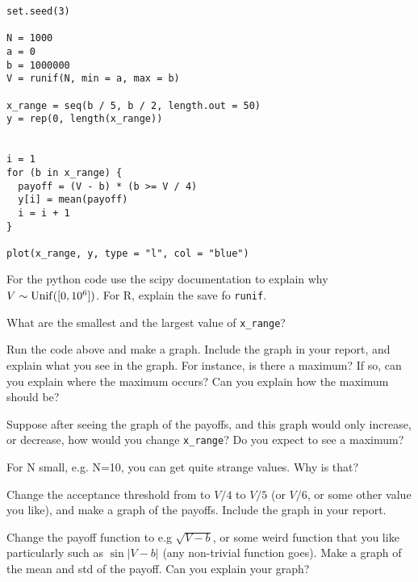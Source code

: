 \begin{verbatim}
set.seed(3)

N = 1000
a = 0
b = 1000000
V = runif(N, min = a, max = b)

x_range = seq(b / 5, b / 2, length.out = 50)
y = rep(0, length(x_range))


i = 1
for (b in x_range) {
  payoff = (V - b) * (b >= V / 4)
  y[i] = mean(payoff)
  i = i + 1
}

plot(x_range, y, type = "l", col = "blue")
\end{verbatim}


\begin{exercise}
For the python code use the scipy documentation to explain why $V\sim\mathrm{Unif}([0,10^{6}])$. For R, explain the save fo \texttt{runif}.
\end{exercise}



\begin{exercise}
What are the smallest and the largest value of \verb|x_range|?
\end{exercise}

\begin{exercise}
Run the code above and make a graph. Include the graph in your report, and explain what you see in the graph. For instance, is there a maximum? If so, can you explain where the maximum occurs? Can you explain how the maximum should be?
\end{exercise}


\begin{exercise}
Suppose after seeing the graph of the payoffs, and this graph would only increase, or decrease, how would you change \verb|x_range|? Do you expect to see a maximum?
\end{exercise}




\begin{exercise}
For N small, e.g. N=10, you can get quite strange values. Why is that?
\end{exercise}


\begin{exercise}
Change the acceptance threshold from to $V/4$ to $V/5$ (or $V/6$, or some other value you like), and make a graph of the payoffs.
Include the graph in your report.
\end{exercise}

\begin{exercise}
Change the payoff function to e.g $\sqrt{V-b}$, or some weird function that you like particularly such as $\sin |V-b|$ (any non-trivial function goes).
Make a graph of the  mean and std of the payoff. Can you explain your graph?
\end{exercise}
